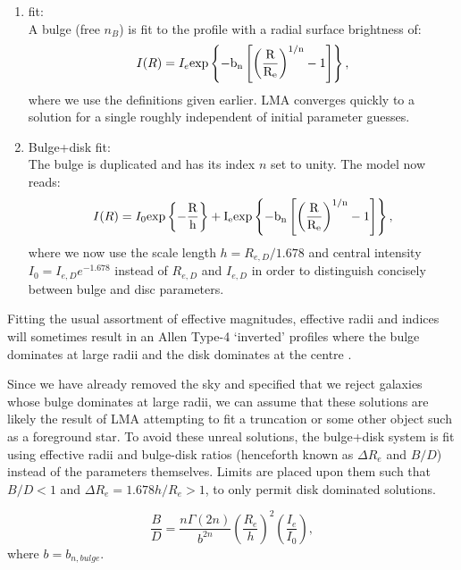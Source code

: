 \begin{enumerate}
	\item \sersic fit: \\
	A \sersic bulge (free $n_B$) is fit to the profile with a radial surface brightness of:
	\begin{equation}
		I(R) = I_{e} \rm{exp}\left\{-b_{n}\left[\left(\frac{R}{R_{e}}\right)^{1/n} - 1\right]\right\},
	\end{equation}
	where we use the definitions given earlier.	LMA converges quickly to a solution for a single \sersic roughly independent of initial parameter guesses. 

	\item Bulge+disk fit: \\
	The \sersic bulge is duplicated and has its \sersic index $n$ set to unity. The model now reads:
	\begin{equation}
		I(R) = I_0 \rm{exp}\left\{-\frac{R}{h}\right\} + I_{e} \rm{exp}\left\{-b_{n}\left[\left(\frac{R}{R_{e}}\right)^{1/n} - 1\right]\right\},
	\end{equation}
	where we now use the scale length $h=R_{e,D}/1.678$ and central intensity $I_0=I_{e,D}e^{-1.678}$ instead of $R_{e,D}$ and $I_{e,D}$ in order to distinguish concisely between bulge and disc parameters. 
\end{enumerate}

Fitting the usual assortment of effective magnitudes, effective radii and \sersic indices will sometimes result in an Allen Type-4 `inverted' profiles where the bulge dominates at large radii and the disk dominates at the centre \citep{allen_millennium_2006}. 

	Since we have already removed the sky and specified that we reject galaxies whose bulge dominates at large radii, we can assume that these solutions are likely the result of LMA attempting to fit a truncation or some other object such as a foreground star. To avoid these unreal solutions, the bulge+disk system is fit using effective radii and bulge-disk ratios (henceforth known as $\Delta R_e$ and $B/D$) instead of the parameters themselves. Limits are placed upon them such that $B/D < 1$ and $\Delta R_e = 1.678 h / R_e > 1$, to only permit disk dominated solutions. 

	\begin{equation}
		\frac{B}{D} = \frac{n \Gamma(2n)}{b^{2n}}\left(\frac{R_e}{h}\right)^{2} \left(\frac{I_e}{I_0}\right),
	\end{equation}
	where $b = b_{n,bulge}$.

